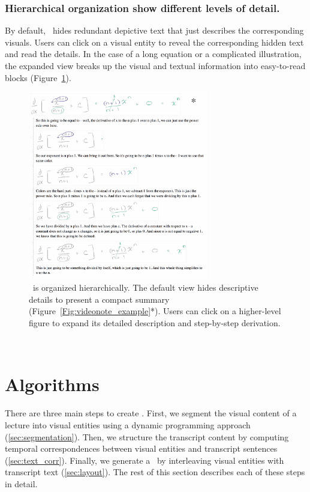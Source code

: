 \subsubsection{Hierarchical organization show different levels of detail.} 
By default, \systemname\ hides redundant depictive text that just describes the corresponding visuals. Users can click on a visual entity to reveal the corresponding hidden text and read the details. In the case of a long equation or a complicated illustration, the expanded view breaks up the visual and textual information 
into easy-to-read blocks (Figure~\ref{Fig:videonote_expanded}). 
%
\begin{figure}[h!]
        \centering
        \includegraphics[width=0.7\textwidth]{figures/videonote_expand.pdf}
	\captionsetup{font=footnotesize}
        \caption{\systemname\ is organized hierarchically. The default view hides descriptive details to present a compact summary (Figure~\ref{Fig:videonote_example}*). Users can click on a higher-level figure to expand its detailed description and step-by-step derivation.} 
        \label{Fig:videonote_expanded}
\end{figure}\\
%

\section{Algorithms}
There are three main steps to create \systemname . First, we
segment the visual content of a lecture into visual entities using a
dynamic programming approach (\ref{sec:segmentation}). Then, we 
structure the transcript content by computing temporal correspondences
between visual entities and transcript sentences
(\ref{sec:text_corr}). Finally, we generate a \systemname\ by interleaving visual entities with transcript text (\ref{sec:layout}). The rest of this section describes each of these steps in detail.
%

